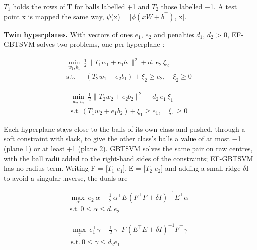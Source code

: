 \documentclass[conference,a4paper]{IEEEtran}
\begin{document}
$T_{1}$ holds the rows of T for balls labelled +1 and $T_{2}$ those labelled $-$1. A test point x is mapped the same way, $\psi$(x) = [$\phi(xW+b^{\top})$, x].

\textbf{Twin hyperplanes.} With vectors of ones $e_{1}$, $e_{2}$ and penalties $d_{1}$, $d_{2}$ > 0, EF-GBTSVM solves two problems, one per hyperplane \cite{r29}:

\begin{equation}
\begin{gathered}
\min_{w_1,b_1}\ \tfrac12\bigl\lVert T_1w_1+e_1b_1\bigr\rVert^2+d_1\,e_2^{\top}\xi_2 \\ \text{s.t.}\ -(T_2w_1+e_2b_1)+\xi_2\ge e_2,\quad \xi_2\ge 0
\end{gathered}
\end{equation}

\begin{equation}
\begin{gathered}
\min_{w_2,b_2}\ \tfrac12\bigl\lVert T_2w_2+e_2b_2\bigr\rVert^2+d_2\,e_1^{\top}\xi_1 \\ \text{s.t.}\ (T_1w_2+e_1b_2)+\xi_1\ge e_1,\quad \xi_1\ge 0
\end{gathered}
\end{equation}

Each hyperplane stays close to the balls of its own class and pushed, through a soft constraint with slack, to give the other class's balls a value of at most $-$1 (plane 1) or at least +1 (plane 2). GBTSVM \cite{r30} solves the same pair on raw centres, with the ball radii added to the right-hand sides of the constraints; EF-GBTSVM has no radius term. Writing F = [$T_{1}$ $e_{1}$], E = [$T_{2}$ $e_{2}$] and adding a small ridge $\delta$I to avoid a singular inverse, the duals are

\begin{equation}
\begin{gathered}
\max_{\alpha}\ e_2^{\top}\alpha-\tfrac12\,\alpha^{\top}E\,(F^{\top}F+\delta I)^{-1}E^{\top}\alpha \\ \text{s.t.}\ 0\le\alpha\le d_1e_2
\end{gathered}
\end{equation}

\begin{equation}
\begin{gathered}
\max_{\gamma}\ e_1^{\top}\gamma-\tfrac12\,\gamma^{\top}F\,(E^{\top}E+\delta I)^{-1}F^{\top}\gamma \\ \text{s.t.}\ 0\le\gamma\le d_2e_1
\end{gathered}
\end{equation}
\end{document}

